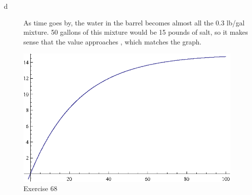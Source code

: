 \documentclass{exam}
\begin{document}
\begin{description}
\begin{description}
          \item[d] As time goes by, the water in the barrel becomes almost all the 0.3 lb/gal mixture.  50 gallons of
            this mixture would be 15 pounds of salt, so it makes sense that the value approaches
            , which matches the graph.

        \end{description}

        \begin{figure}[H]
          \centering
          \includegraphics[scale=0.9]{exercise68.eps}
          \caption*{Exercise 68}
        \end{figure}





\end{description}
\end{document}
